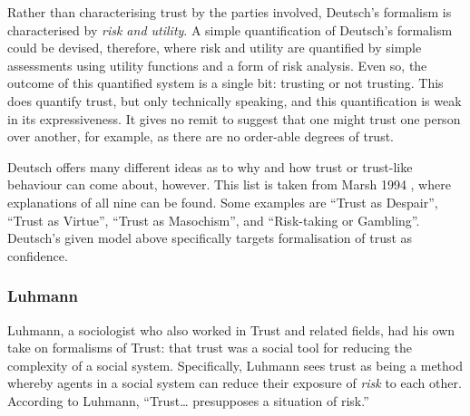Rather than characterising trust by the parties involved, Deutsch's formalism is characterised by \emph{risk and utility}. A simple quantification of Deutsch's formalism could be devised, therefore, where risk and utility are quantified by simple assessments using utility functions and a form of risk analysis. Even so, the outcome of this quantified system is a single bit: trusting or not trusting. This does quantify trust, but only technically speaking, and this quantification is weak in its expressiveness. It gives no remit to suggest that one might trust one person over another, for example, as there are no order-able degrees of trust.

Deutsch offers many different ideas as to why and how trust or trust-like behaviour can come about, however. This list is taken from Marsh 1994 \parencite{Marsh1994FormalisingConcept}, where explanations of all nine can be found. Some examples are ``Trust as Despair'', ``Trust as Virtue'', ``Trust as Masochism'', and ``Risk-taking or Gambling''. Deutsch's given model above specifically targets formalisation of trust as confidence.

% 

\subsubsection{Luhmann}
Luhmann, a sociologist who also worked in Trust and related fields, had his own take on formalisms of Trust: that trust was a social tool for reducing the complexity of a social system. Specifically, Luhmann sees trust as being a method whereby agents in a social system can reduce their exposure of \emph{risk} to each other. According to Luhmann, ``Trust{\ldots} presupposes a situation of risk.'' \parencite{luhmann2000familiarity}\par

